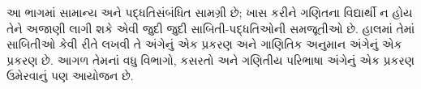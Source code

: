 \documentclass[../../include/open-logic-part]{subfiles}
\begin{document}

\begin{editorial}
  આ ભાગમાં સામાન્ય અને પદ્ધતિસંબંધિત સામગ્રી છે;
  ખાસ કરીને ગણિતના વિદ્યાર્થી ન હોય તેને અજાણી લાગી શકે
  એવી જુદી જુદી સાબિતી-પદ્ધતિઓની સમજૂતીઓ છે. હાલમાં
  તેમાં સાબિતીઓ કેવી રીતે લખવી તે અંગેનું એક પ્રકરણ
  અને ગાણિતિક અનુમાન અંગેનું એક પ્રકરણ છે. આગળ
  તેમનાં વધુ વિભાગો, કસરતો અને ગણિતીય પરિભાષા
  અંગેનું એક પ્રકરણ ઉમેરવાનું પણ આયોજન છે.
\end{editorial}



\OLEndPartHook
\end{document}
